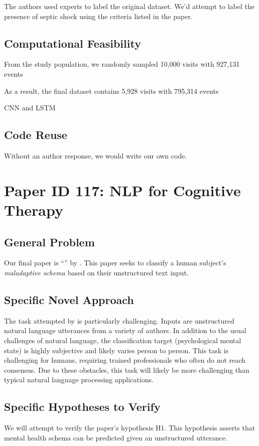 \documentclass[11pt,a4paper]{article}
\begin{document}
The authors used experts to label the original dataset. We'd attempt to label the presence of septic shock using the criteria listed in the paper.

\subsection{Computational Feasibility}

From the study population,
we randomly sampled 10,000 visits with 927,131 events

As a result, the final dataset contains 5,928
visits with 795,314 events

CNN and LSTM

\subsection{Code Reuse}
Without an author response, we would write our own code.

\section{Paper ID 117: NLP for Cognitive Therapy}
\subsection{General Problem}
Our final paper is ``'' by \citeauthor*{burger_2021}. This paper seeks to classify a human subject's \emph{maladaptive schema} based on their unstructured text input. 

\subsection{Specific Novel Approach}
The task attempted by \citet{burger_2021} is particularly challenging. Inputs are unstructured natural language utterances from a variety of authors. In addition to the usual challenges of natural language, the classification target (psychological mental state) is highly subjective and likely varies person to person. This task is challenging for humans, requiring trained professionals who often do not reach consensus. Due to these obstacles, this task will likely be more challenging than typical natural language processing applications. 

\subsection{Specific Hypotheses to Verify}
We will attempt to verify the paper's hypothesis H1. This hypothesis asserts that mental health schema can be predicted given an unstructured utterance. 
\end{document}
